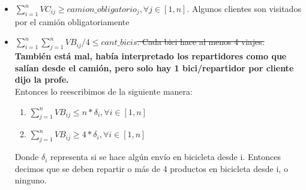 \documentclass[11pt,a4paper]{article}
\begin{document}
\begin{itemize}
    \item  $\sum_{i=1}^{n} VC_{ij} \geq camion\_obligatorio_j, \forall j \in [1,n] $. Algunos clientes son visitados por el camión obligatoriamente
    \item \st{$\sum_{i=1}^{n}\sum_{j=1}^{n} VB_{ij}/4 \leq cant\_bicis$. Cada bici hace al menos 4 viajes.} \textbf{También está mal, había interpretado los repartidores como que salían desde el camión, pero solo hay 1 bici/repartidor por cliente dijo la profe.}\\
    Entonces lo reescribimos de la siguiente manera:
    \begin{enumerate}
        \item $  \sum_{j=1}^{n} VB_{ij} \leq n*\delta_i, \forall i \in [1,n]$
        \item $\sum_{j=1}^{n} VB_{ij} \geq 4*\delta_i, \forall i \in [1,n] $
    \end{enumerate}
    Donde $\delta_i$ representa si se hace algún envío en bicicleta desde i. Entonces decimos que se deben repartir o más de 4 productos en bicicleta desde i, o ninguno.
\end{itemize}



\renewcommand{\refname}{Bibliografía}


\end{document}
